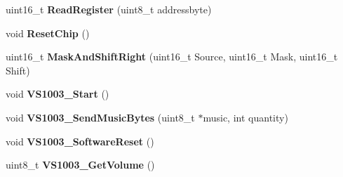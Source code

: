 \begin{DoxyCompactItemize}
\item 
\hypertarget{group___v_s1003_gae51b9bfdc776a71e1c64ffc3503b2580}{
uint16\_\-t {\bfseries ReadRegister} (uint8\_\-t addressbyte)}
\label{group___v_s1003_gae51b9bfdc776a71e1c64ffc3503b2580}

\item 
\hypertarget{group___v_s1003_ga1b092c177915e46cae517600bf819cfd}{
void {\bfseries ResetChip} ()}
\label{group___v_s1003_ga1b092c177915e46cae517600bf819cfd}

\item 
\hypertarget{group___v_s1003_gadd5c859ee4ed93f5d83de7de2cc94241}{
uint16\_\-t {\bfseries MaskAndShiftRight} (uint16\_\-t Source, uint16\_\-t Mask, uint16\_\-t Shift)}
\label{group___v_s1003_gadd5c859ee4ed93f5d83de7de2cc94241}

\item 
\hypertarget{group___v_s1003_ga18c3607ab21c8fb7efe74b24fa38a78d}{
void {\bfseries VS1003\_\-Start} ()}
\label{group___v_s1003_ga18c3607ab21c8fb7efe74b24fa38a78d}

\item 
\hypertarget{group___v_s1003_gaa288639093463230709dfda6232b7bbf}{
void {\bfseries VS1003\_\-SendMusicBytes} (uint8\_\-t $\ast$music, int quantity)}
\label{group___v_s1003_gaa288639093463230709dfda6232b7bbf}

\item 
\hypertarget{group___v_s1003_gac6d1b4cad8488b1afd6d0ac377f2535c}{
void {\bfseries VS1003\_\-SoftwareReset} ()}
\label{group___v_s1003_gac6d1b4cad8488b1afd6d0ac377f2535c}

\item 
\hypertarget{group___v_s1003_ga109e7148f5f6b2307937456ebfccb492}{
uint8\_\-t {\bfseries VS1003\_\-GetVolume} ()}
\label{group___v_s1003_ga109e7148f5f6b2307937456ebfccb492}


\end{DoxyCompactItemize}
